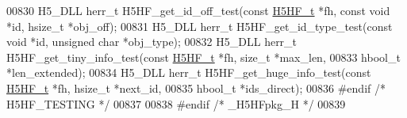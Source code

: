 \begin{DoxyCode}
00830 H5\_DLL herr\_t H5HF\_get\_id\_off\_test(\textcolor{keyword}{const} \hyperlink{struct_h5_h_f__t}{H5HF\_t} *fh, \textcolor{keyword}{const} \textcolor{keywordtype}{void} *\textcolor{keywordtype}{id}, hsize\_t *obj\_off);
00831 H5\_DLL herr\_t H5HF\_get\_id\_type\_test(\textcolor{keyword}{const} \textcolor{keywordtype}{void} *\textcolor{keywordtype}{id}, \textcolor{keywordtype}{unsigned} \textcolor{keywordtype}{char} *obj\_type);
00832 H5\_DLL herr\_t H5HF\_get\_tiny\_info\_test(\textcolor{keyword}{const} \hyperlink{struct_h5_h_f__t}{H5HF\_t} *fh, \textcolor{keywordtype}{size\_t} *max\_len,
00833     hbool\_t *len\_extended);
00834 H5\_DLL herr\_t H5HF\_get\_huge\_info\_test(\textcolor{keyword}{const} \hyperlink{struct_h5_h_f__t}{H5HF\_t} *fh, hsize\_t *next\_id,
00835     hbool\_t *ids\_direct);
00836 \textcolor{preprocessor}{#endif }\textcolor{comment}{/* H5HF\_TESTING */}\textcolor{preprocessor}{}
00837 
00838 \textcolor{preprocessor}{#endif }\textcolor{comment}{/* \_H5HFpkg\_H */}\textcolor{preprocessor}{}
00839 
\end{DoxyCode}
